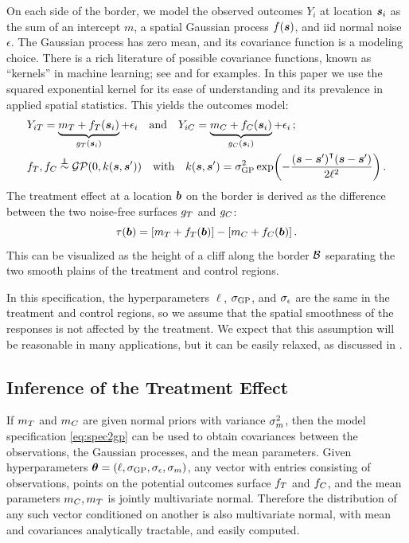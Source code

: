 On each side of the border, we model the observed outcomes \(Y_i\) at location \(\bm{s}_i\) as the sum of an intercept \(m\), a spatial Gaussian process \(f(\bm{s})\), and iid normal noise \(\epsilon\).
The Gaussian process has zero mean, and its covariance function is a modeling choice.
There is a rich literature of possible covariance functions, known as ``kernels'' in machine learning; see
\cite{banerjee2014hierarchical} and \cite{rasmussen2006gaussian} for examples.
In this paper we use the squared exponential kernel for its ease of understanding and its prevalence in applied spatial statistics.
This yields the outcomes model:
\begin{equation}
    \begin{split}
        & Y_{i\treat} = \underbrace{m_\treat{} + f_\treat{}(\svec_i)}_{g_\treat{}(\svec_i)} + \epsilon_i \quad\text{and}\quad
        Y_{i\ctrol} = \underbrace{m_\ctrol{} + f_\ctrol{}(\svec_i)}_{g_\ctrol{}(\svec_i)} + \epsilon_i \,; \\
        & f_\treat{}, f_\ctrol{} \overset{\indep}{\sim} \GP\del{0, k(\svec, \svec')} \quad\text{with}\quad
        k(\svec,\svec') = \sigmaf^2 \exp\del{ - \frac{\del{\svec-\svec'}\trans\del{\svec-\svec'}}{2 \ell^2}} \,.
    \end{split}
    \label{eq:spec2gp}
\end{equation}
The treatment effect at a location \(\bm{b}\) on the border is derived as the difference between the two noise-free surfaces \(g_T{}\) and \(g_C{}\):
\begin{equation}
    \tau(\sentinel) = \sbr{m_\treat{} + f_\treat{}(\sentinel)} - \sbr{m_\ctrol{} + f_\ctrol{}(\sentinel)}\,.
\end{equation}
This can be visualized as the height of a cliff along the border \(\mathcal{B}\) separating the two smooth plains of the treatment and control regions.

In this specification, the hyperparameters \(\ell\), \(\sigma_{\mathrm{GP}}\), and \(\sigma_{\epsilon}\) are the same in the treatment and control regions, so we assume that the spatial smoothness of the responses is not affected by the treatment.
We expect that this assumption will be reasonable in many applications, but it can be easily relaxed, as discussed in \cite{Branson:2017qy}.

\subsection{Inference of the Treatment Effect}
\label{sec:inference}
If \(m_T\) and \(m_C\) are given normal priors with variance \(\sigma_{m}^2\), then the model specification \autoref{eq:spec2gp} can be used to obtain covariances between the observations, the Gaussian processes, and the mean parameters.
Given hyperparameters \(\bm{\theta} = \left\lparen\ell,\sigma_{\mathrm{GP}}, \sigma_{\epsilon}, \sigma_{m}\right\rparen\), any vector with entries consisting of observations, points on the potential outcomes surface \(f_{T}\) and \(f_{C}\), and the mean parameters \(m_{C}, m_{T}\) is jointly multivariate normal. Therefore the distribution of any such vector conditioned on another is also multivariate normal, with mean and covariances analytically tractable, and easily computed.

